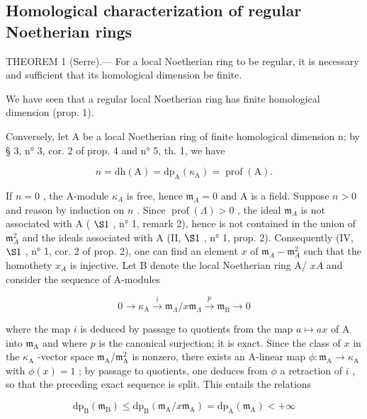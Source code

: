 \subsection{Homological characterization of regular Noetherian rings}

THEOREM 1 (Serre).--- For a local Noetherian ring to be regular, it is necessary and sufficient that its homological dimension be finite.

We have seen that a regular local Noetherian ring has finite homological dimension (prop. 1).

Conversely, let A be a local Noetherian ring of finite homological dimension n; by § 3, n° 3, cor. 2 of prop. 4 and n° 5, th. 1, we have

\[
n = \mathrm{dh} (\mathrm{A}) = \mathrm{dp} _ {\mathrm{A}} (\kappa_ {\mathrm{A}}) = \operatorname{prof} (\mathrm{A}).
\]

If \(n=0\) , the A-module \(\kappa_{A}\) is free, hence \(\mathfrak{m}_{A}=0\) and A is a field. Suppose \(n>0\) and reason by induction on \(n\) . Since \(\operatorname{prof}(\Lambda)>0\) , the ideal \(\mathfrak{m}_{A}\) is not associated with A ( \(\S 1\) , n° 1, remark 2), hence is not contained in the union of \(\mathfrak{m}_{A}^{2}\) and the ideals associated with A (II, \(\S 1\) , n° 1, prop. 2). Consequently (IV, \(\S 1\) , n° 1, cor. 2 of prop. 2), one can find an element \(x\) of \(\mathfrak{m}_{A}-\mathfrak{m}_{A}^{2}\) such that the homothety \(x_{A}\) is injective. Let B denote the local Noetherian ring A/ \(xA\) and consider the sequence of A-modules

\[
0 \to \kappa_ {\mathrm{A}} \stackrel {i} {\longrightarrow} \mathfrak {m} _ {\Lambda} / x \mathfrak {m} _ {\Lambda} \stackrel {p} {\longrightarrow} \mathfrak {m} _ {\mathrm{B}} \to 0
\]

where the map \(i\) is deduced by passage to quotients from the map \(a \mapsto ax\) of A into \(\mathfrak{m}_{\mathrm{A}}\) and where \(p\) is the canonical surjection; it is exact. Since the class of \(x\) in the \(\kappa_{\mathrm{A}}\) -vector space \(\mathfrak{m}_{\mathrm{A}} / \mathfrak{m}_{\mathrm{A}}^{2}\) is nonzero, there exists an A-linear map \(\phi : \mathfrak{m}_{\mathrm{A}} \to \kappa_{\mathrm{A}}\) with \(\phi(x) = 1\) ; by passage to quotients, one deduces from \(\phi\) a retraction of \(i\) , so that the preceding exact sequence is split. This entails the relations

\[
\mathrm{dp} _ {\mathrm{B}} \left(\mathfrak {m} _ {\mathrm{B}}\right) \leqslant \mathrm{dp} _ {\mathrm{B}} \left(\mathfrak {m} _ {\mathrm{A}} / x \mathfrak {m} _ {\mathrm{A}}\right) = \mathrm{dp} _ {\mathrm{A}} \left(\mathfrak {m} _ {\mathrm{A}}\right) <   + \infty
\]

